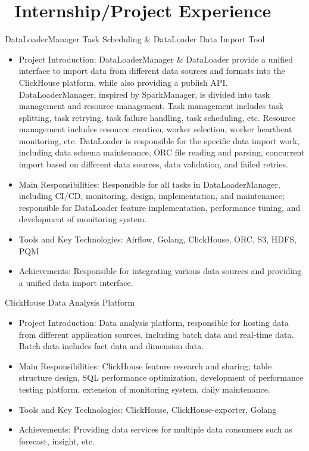 \documentclass{resume}
\begin{document}
\section{\faUsers\ Internship/Project Experience}
DataLoaderManager Task Scheduling \& DataLoader Data Import Tool
\begin{itemize}
\item Project Introduction: DataLoaderManager \& DataLoader provide a unified interface to import data from different data sources and formats into the ClickHouse platform, while also providing a publish API. DataLoaderManager, inspired by SparkManager, is divided into task management and resource management. Task management includes task splitting, task retrying, task failure handling, task scheduling, etc. Resource management includes resource creation, worker selection, worker heartbeat monitoring, etc. DataLoader is responsible for the specific data import work, including data schema maintenance, ORC file reading and parsing, concurrent import based on different data sources, data validation, and failed retries.
\item Main Responsibilities: Responsible for all tasks in DataLoaderManager, including CI/CD, monitoring, design, implementation, and maintenance; responsible for DataLoader feature implementation, performance tuning, and development of monitoring system.
\item Tools and Key Technologies: Airflow, Golang, ClickHouse, ORC, S3, HDFS, PQM
\item Achievements: Responsible for integrating various data sources and providing a unified data import interface.
\end{itemize}
ClickHouse Data Analysis Platform
\begin{itemize}
\item Project Introduction: Data analysis platform, responsible for hosting data from different application sources, including batch data and real-time data. Batch data includes fact data and dimension data.
\item Main Responsibilities: ClickHouse feature research and sharing; table structure design, SQL performance optimization, development of performance testing platform, extension of monitoring system, daily maintenance.
\item Tools and Key Technologies: ClickHouse, ClickHouse-exporter, Golang
\item Achievements: Providing data services for multiple data consumers such as forecast, insight, etc.
\end{itemize}
\end{document}
